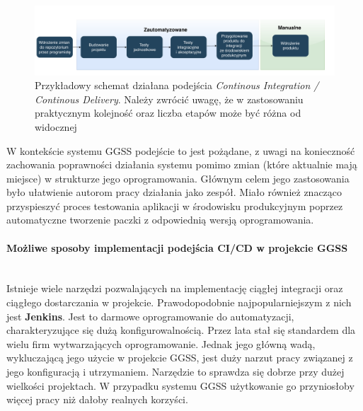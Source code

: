\begin{figure}[H]
\centering
\caption{Przykładowy schemat działana podejścia \textit{Continous Integration / Continous Delivery}. Należy zwrócić uwagę, że w zastosowaniu praktycznym kolejność oraz liczba etapów może być różna od widocznej}
\label{fig:cicd}
\includegraphics[width=\textwidth]{res/CICD.pdf}
\end{figure}

W kontekście systemu GGSS podejście to jest pożądane, z uwagi na konieczność zachowania poprawności działania systemu pomimo zmian (które aktualnie mają miejsce) w strukturze jego oprogramowania. Głównym celem jego zastosowania było ułatwienie autorom pracy działania jako zespół. Miało również znacząco przyspieszyć proces testowania aplikacji w środowisku produkcyjnym poprzez automatyczne tworzenie paczki z odpowiednią wersją oprogramowania.

\paragraph*{Możliwe sposoby implementacji podejścia CI/CD w projekcie GGSS}\mbox{}\\
Istnieje wiele narzędzi pozwalających na implementację ciągłej integracji oraz ciągłego dostarczania w projekcie. Prawodopodobnie najpopularniejszym z nich jest \textbf{Jenkins}. Jest to darmowe oprogramowanie do automatyzacji, charakteryzujące się dużą konfigurowalnością. Przez lata stał się standardem dla wielu firm wytwarzających oprogramowanie. Jednak jego główną wadą, wykluczającą jego użycie w projekcie GGSS, jest duży narzut pracy związanej z jego konfiguracją i utrzymaniem. Narzędzie to sprawdza się dobrze przy dużej wielkości projektach. W przypadku systemu GGSS użytkowanie go przyniosłoby więcej pracy niż dałoby realnych korzyści. 

